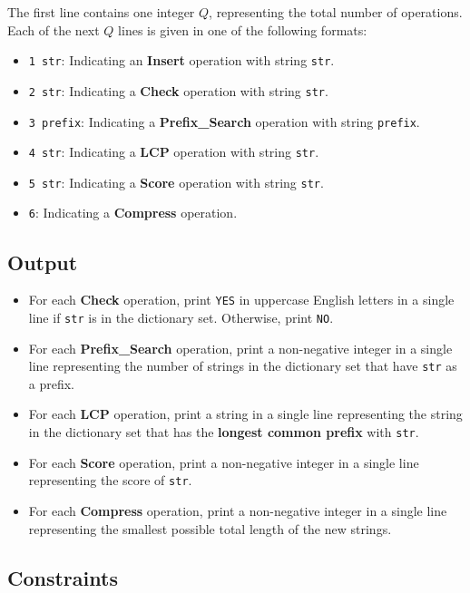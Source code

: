 The first line contains one integer $Q$, representing the total number of operations. Each of the next $Q$ lines is given in one of the following formats:
\begin{itemize}
    \item \texttt{1 str}: Indicating an \textbf{Insert} operation with string \texttt{str}.
    \item \texttt{2 str}: Indicating a \textbf{Check} operation with string \texttt{str}.
    \item \texttt{3 prefix}: Indicating a \textbf{Prefix\_Search} operation with string \texttt{prefix}.
    \item \texttt{4 str}: Indicating a \textbf{LCP} operation with string \texttt{str}.
    \item \texttt{5 str}: Indicating a \textbf{Score} operation with string \texttt{str}.
    \item \texttt{6}: Indicating a \textbf{Compress} operation.
\end{itemize}

\subsection{Output}\label{output}

\begin{itemize}
    \item For each \textbf{Check} operation, print \texttt{YES} in uppercase English letters in a single line if \texttt{str} is in the dictionary set. Otherwise, print \texttt{NO}.
    \item For each \textbf{Prefix\_Search} operation, print a non-negative integer in a single line representing the number of strings in the dictionary set that have \texttt{str} as a prefix.
    \item For each \textbf{LCP} operation, print a string in a single line representing the string in the dictionary set that has the \textbf{longest common prefix} with \texttt{str}.
    \item For each \textbf{Score} operation, print a non-negative integer in a single line representing the score of \texttt{str}.
    \item For each \textbf{Compress} operation, print a non-negative integer in a single line representing the smallest possible total length of the new strings.
\end{itemize}

\subsection{Constraints}

